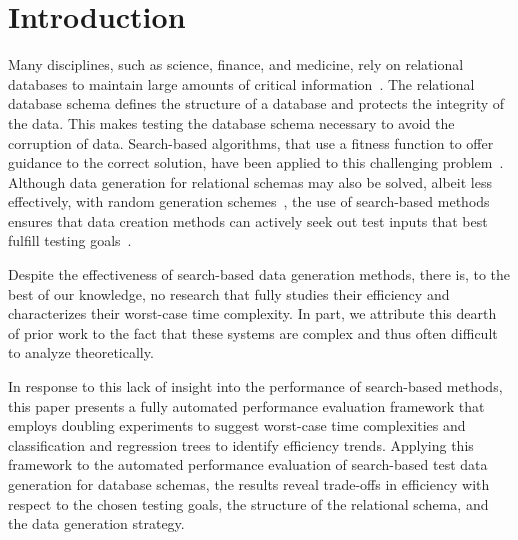 
\vspace*{-.25in}
\section{Introduction}
\vspace*{-.05in}



Many disciplines, such as science, finance, and medicine, rely on relational databases to maintain large amounts of
critical information~\cite{kapfhammer2007}. The relational database schema defines the structure of a database and
protects the integrity of the data. This makes testing the database schema necessary to avoid the corruption of data.
Search-based algorithms, that use a fitness function to offer guidance to the correct solution, have been applied to
this challenging problem~\cite{kapfhammer2013}. Although data generation for relational schemas may also be solved,
albeit less effectively, with random generation schemes~\cite{mcminn2015}, the use of search-based methods ensures that
data creation methods can actively seek out test inputs that best fulfill testing goals~\cite{mcminn2004a}.



Despite the effectiveness of search-based data generation methods, there is, to the best of our knowledge, no research
that fully studies their efficiency and characterizes their worst-case time complexity. In part, we attribute this
dearth of prior work to the fact that these systems are complex and thus often difficult to analyze theoretically.

In response to this lack of insight into the performance of search-based methods, this paper presents a fully automated
performance evaluation framework that employs doubling experiments to suggest worst-case time complexities and
classification and regression trees to identify efficiency trends. Applying this framework to the automated performance
evaluation of search-based test data generation for database schemas, the results reveal trade-offs in efficiency with
respect to the chosen testing goals, the structure of the relational schema, and the data generation strategy.

